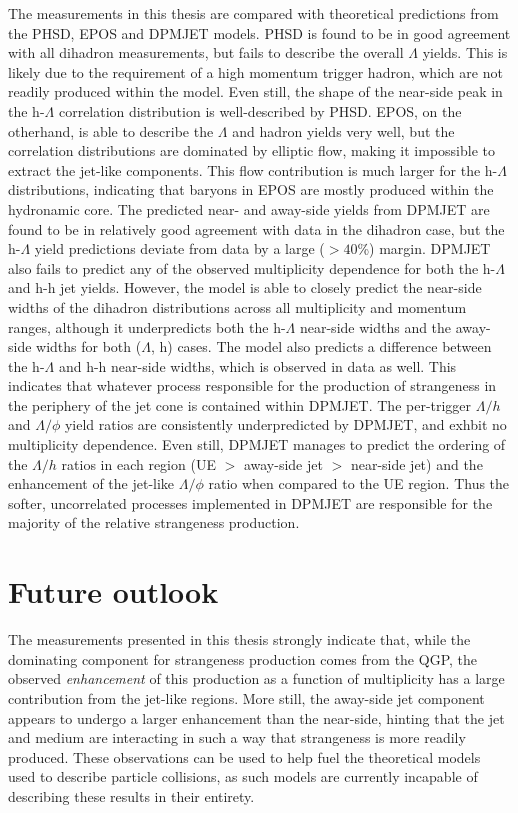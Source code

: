 The measurements in this thesis are compared with theoretical predictions from the PHSD, EPOS and DPMJET models. PHSD is found to be in good agreement with all dihadron measurements, but fails to describe the overall $\Lambda$ yields. This is likely due to the requirement of a high momentum trigger hadron, which are not readily produced within the model. Even still, the shape of the near-side peak in the h-$\Lambda$ correlation distribution is well-described by PHSD. EPOS, on the otherhand, is able to describe the $\Lambda$ and hadron yields very well, but the correlation distributions are dominated by elliptic flow, making it impossible to extract the jet-like components. This flow contribution is much larger for the h-$\Lambda$ distributions, indicating that \lmb baryons in EPOS are mostly produced within the hydronamic core. The predicted near- and away-side yields from DPMJET are found to be in relatively good agreement with data in the dihadron case, but the h-$\Lambda$ yield predictions deviate from data by a large ($>40$\%) margin. DPMJET also fails to predict any of the observed multiplicity dependence for both the h-$\Lambda$ and h-h jet yields. However, the model is able to closely predict the near-side widths of the dihadron distributions across all multiplicity and momentum ranges, although it underpredicts both the h-$\Lambda$ near-side widths and the away-side widths for both ($\Lambda$, h) cases. The model also predicts a difference between the h-$\Lambda$ and h-h near-side widths, which is observed in data as well. This indicates that whatever process responsible for the production of strangeness in the periphery of the jet cone is contained within DPMJET. The per-trigger $\Lambda/h$ and $\Lambda/\phi$ yield ratios  are consistently underpredicted by DPMJET, and exhbit no multiplicity dependence. Even still, DPMJET manages to predict the ordering of the $\Lambda/h$ ratios in each region (UE $>$ away-side jet $>$ near-side jet) and the enhancement of the jet-like $\Lambda/\phi$ ratio when compared to the UE region. Thus the softer, uncorrelated processes implemented in DPMJET are responsible for the majority of the relative strangeness production. 


\section{Future outlook}

The measurements presented in this thesis strongly indicate that, while the dominating component for strangeness production comes from the QGP, the observed \textit{enhancement} of this production as a function of multiplicity has a large contribution from the jet-like regions. More still, the away-side jet component appears to undergo a larger enhancement than the near-side, hinting that the jet and medium are interacting in such a way that strangeness is more readily produced. These observations can be used to help fuel the theoretical models used to describe particle collisions, as such models are currently incapable of describing these results in their entirety. 

